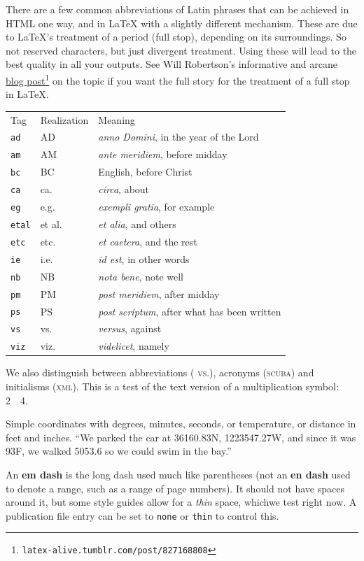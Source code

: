 \documentclass[pdflatex]{sn-jnl}
\theoremstyle{thmstyleone}%
\theoremstyle{thmstyletwo}%
\theoremstyle{thmstylethree}%
\newcommand{\tabularfont}{\relax}
\newcommand{\mono}[1]{\texttt{#1}}
\newcommand{\initialism}[1]{\textsc{\MakeLowercase{#1}}}
\newcommand{\acronym}[1]{\textsc{\MakeLowercase{#1}}}
\newcommand{\abbreviation}[1]{%
\textsc{\MakeLowercase{#1}}}
\newcommand{\terminology}[1]{\textbf{#1}}
\numberwithin{equation}{section}
\begin{document}
\par
There are a few  common abbreviations of Latin phrases that can be achieved in HTML one way, and in \LaTeX{} with a slightly different mechanism.  These are due to \LaTeX{}'s treatment of a period (full stop), depending on its surroundings.  So not reserved characters, but just divergent treatment.  Using these will lead to the best quality in all your outputs.  See Will Robertson's informative and arcane \href{http://latex-alive.tumblr.com/post/827168808/correct-punctuation-spaces}{blog post}\footnote{\nolinkurl{latex-alive.tumblr.com/post/827168808}\label{section-text-paragraphs-8-10-4}} on the topic if you want the full story for the treatment of a full stop in \LaTeX{}.%
\begin{center}%
{\tabularfont%
\begin{tabular}{lll}
Tag&Realization&Meaning\tabularnewline[0pt]
\mono{ad}&AD&\textit{anno Domini}, in the year of the Lord\tabularnewline[0pt]
\mono{am}&AM&\textit{ante meridiem}, before midday\tabularnewline[0pt]
\mono{bc}&BC&English, before Christ\tabularnewline[0pt]
\mono{ca}&ca.\@&\textit{circa}, about\tabularnewline[0pt]
\mono{eg}&e.g.\@&\textit{exempli gratia}, for example\tabularnewline[0pt]
\mono{etal}&et al.\@&\textit{et alia}, and others\tabularnewline[0pt]
\mono{etc}&etc.\@&\textit{et caetera}, and the rest\tabularnewline[0pt]
\mono{ie}&i.e.\@&\textit{id est}, in other words\tabularnewline[0pt]
\mono{nb}&NB&\textit{nota bene}, note well\tabularnewline[0pt]
\mono{pm}&PM&\textit{post meridiem}, after midday\tabularnewline[0pt]
\mono{ps}&PS&\textit{post scriptum}, after what has been written\tabularnewline[0pt]
\mono{vs}&vs.\@&\textit{versus}, against\tabularnewline[0pt]
\mono{viz}&viz.\@&\textit{videlicet}, namely
\end{tabular}
}%
\end{center}%
We also distinguish between abbreviations (\abbreviation{vs.}), acronyms (\acronym{SCUBA}) and initialisms (\initialism{XML}).  This is a test of the text version of a multiplication symbol: 2~\texttimes{}~4.%
\par
Simple coordinates with degrees, minutes, seconds, or temperature, or distance in feet and inches.  ``We parked the car at 36\textdegree{}16\textquotesingle{}0.83\textquotesingle\textquotesingle{}N, 122\textdegree{}35\textquotesingle{}47.27\textquotesingle\textquotesingle{}W, and since it was 93\textdegree{}F, we walked 505\textquotesingle{}3.6\textquotesingle\textquotesingle{} so we could swim in the bay.''%
\par
An \terminology{em dash} is the long dash used much like parentheses (not an \terminology{en dash} used to denote a range, such as a range of page numbers).  It should not have spaces around it, but some style guides allow for a \emph{thin} space, which\textemdash{}we test right now.  A publication file entry can be set to \mono{none} or \mono{thin} to control this.%
%
%
\typeout{************************************************}
\typeout{************************************************}
%
\end{document}
